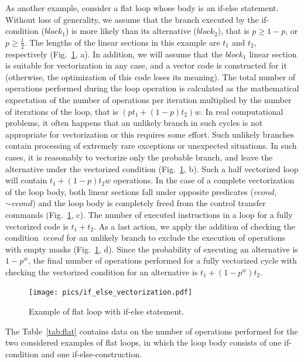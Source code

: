 \documentclass[
11pt,%
tightenlines,%
twoside,%
onecolumn,%
nofloats,%
nobibnotes,%
nofootinbib,%
superscriptaddress,%
noshowpacs,%
centertags]%
{revtex4}
\begin{document}
As another example, consider a flat loop whose body is an if-else statement.
Without loss of generality, we assume that the branch executed by the if-condition ($block_1$) is more likely than its alternative ($block_2$), that is $p \ge 1 - p$, or $p \ge \frac{1}{2}$.
The lengths of the linear sections in this example are $t_1$ and $t_2$, respectively (Fig.~\ref{fig:flat_loop_2}, a).
In addition, we will assume that the $block_1$ linear section is suitable for vectorization in any case, and a vector code is constructed for it (otherwise, the optimization of this code loses its meaning).
The total number of operations performed during the loop operation is calculated as the mathematical expectation of the number of operations per iteration multiplied by the number of iterations of the loop, that is $(pt_1 + (1 - p) t_2) w$.
In real computational problems, it often happens that an unlikely branch in such cycles is not appropriate for vectorization or this requires some effort.
Such unlikely branches contain processing of extremely rare exceptions or unexpected situations.
In such cases, it is reasonably to vectorize only the probable branch, and leave the alternative under the vectorized condition (Fig.~\ref{fig:flat_loop_2}, b).
Such a half vectorized loop will contain $t_1 + (1 - p) t_2w$ operations.
In the case of a complete vectorization of the loop body, both linear sections fall under opposite predicates ($vcond$, ${\sim}vcond$) and the loop body is completely freed from the control transfer commands (Fig.~\ref{fig:flat_loop_2}, c).
The number of executed instructions in a loop for a fully vectorized code is $t_1 + t_2$.
As a last action, we apply the addition of checking the condition $~vcond$ for an unlikely branch to exclude the execution of operations with empty masks (Fig.~\ref{fig:flat_loop_2}, d).
Since the probability of executing an alternative is $1 - p ^ w$, the final number of operations performed for a fully vectorized cycle with checking the vectorized condition for an alternative is $t_1 + (1 - p ^ w) t_2$.

\begin{figure}[h]
\setcaptionmargin{5mm}
\onelinecaptionstrue
\texttt{[image: pics/if\_else\_vectorization.pdf]}
\caption{Example of flat loop with if-else statement.}
\label{fig:flat_loop_2}
\end{figure}

The Table~\ref{tab:flat} contains data on the number of operations performed for the two considered examples of flat loops, in which the loop body consists of one if-condition and one if-else-construction.
\end{document}
